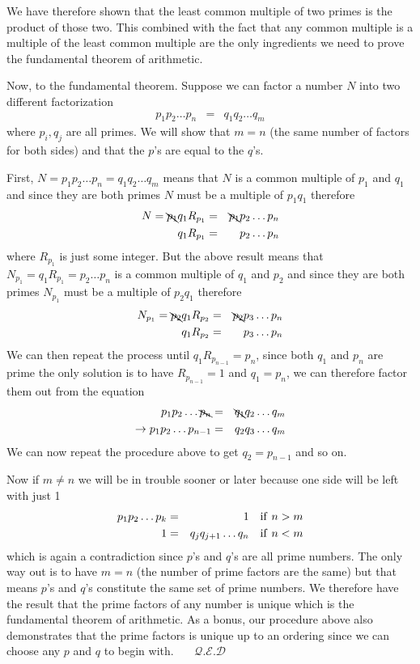\documentclass[aps,preprint,preprintnumbers,nofootinbib,showpacs,prd]{revtex4-1}
\newcommand{\nbea}{\begin{eqnarray*}}
\newcommand{\neea}{\end{eqnarray*}}
\begin{document}
We have therefore shown that the least common multiple of two primes is the product of those two. This combined with the fact that any common multiple is a multiple of the least common multiple are the only ingredients we need to prove the fundamental theorem of arithmetic.

Now, to the fundamental theorem. Suppose we can factor a number $N$ into two different factorization
%
\nbea
p_1 p_2 \dots p_n & = & q_1 q_2 \dots q_m
\neea
%
where $p_i, q_j$ are all primes. We will show that $m=n$ (the same number of factors for both sides) and that the $p$'s are equal to the $q$'s.

First, $N=p_1 p_2 \dots p_n = q_1 q_2 \dots q_m$ means that $N$ is a common multiple of $p_1$ and $q_1$ and since they are both primes $N$ must be a multiple of $p_1q_1$ therefore
%
\nbea
N = \bcancel{p_1} q_1 R_{p_1} & = & \bcancel{p_1} p_2 \dots p_n \\
q_1 R_{p_1} & = & p_2 \dots p_n
\neea
%
where $R_{p_1}$ is just some integer. But the above result means that $N_{p_1} = q_1 R_{p_1} = p_2 \dots p_n$ is a common multiple of $q_1$ and $p_2$ and since they are both primes $N_{p_1}$ must be a multiple of $p_2q_1$ therefore
%
\nbea
N_{p_1} = \bcancel{p_2} q_1 R_{p_2} & = & \bcancel{p_2} p_3 \dots p_n \\
q_1 R_{p_2} & = & p_3 \dots p_n
\neea
%
We can then repeat the process until $q_1 R_{p_{n-1}} = p_n$, since both $q_1$ and $p_n$ are prime the only solution is to have $R_{p_{n-1}} = 1$ and $q_1 = p_n$, we can therefore factor them out from the equation
%
\nbea
p_1 p_2 \dots \bcancel{p_n} & = & \bcancel{q_1} q_2 \dots q_m \\
\to p_1 p_2 \dots p_{n-1} & = & q_2 q_3 \dots q_m
\neea
%
We can now repeat the procedure above to get $q_2 = p_{n-1}$ and so on.

Now if $m\neq n$ we will be in trouble sooner or later because one side will be left with just 1
%
\nbea
p_1 p_2 \dots p_k & = & 1 ~~~ {\rm if~} n > m \\
1 & = & q_j q_{j+1} \dots q_n ~~~ {\rm if~} n < m 
\neea
%
which is again a contradiction since $p$'s and $q$'s are all prime numbers. The only way out is to have $m=n$ (the number of prime factors are the same) but that means $p$'s and $q$'s constitute the same set of prime numbers. We therefore have the result that the prime factors of any number is unique which is the fundamental theorem of arithmetic. As a bonus, our procedure above also demonstrates that the prime factors is unique up to an ordering since we can choose any $p$ and $q$ to begin with.~~~ $\mathcal{Q.E.D}$
\end{document}
